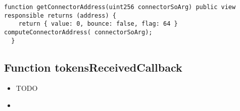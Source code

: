 \begin{lstlisting}[firstnumber=108]
  function getConnectorAddress(uint256 connectorSoArg) public view responsible returns (address) {
    return { value: 0, bounce: false, flag: 64 } computeConnectorAddress( connectorSoArg);
  }
\end{lstlisting}

\subsection{Function tokensReceivedCallback}

\begin{itemize}
\item TODO
\item \issueEncodeBody
\end{itemize}

